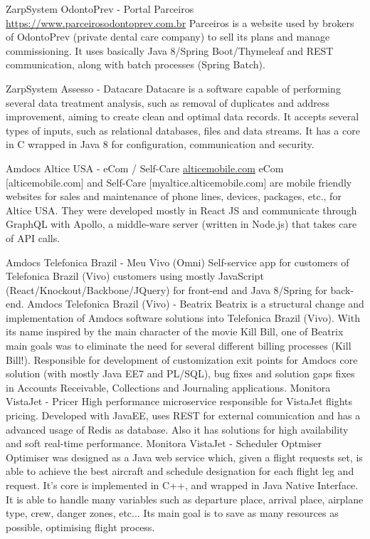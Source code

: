 \documentclass[]{friggeri-cv}
\begin{document}
\begin{entrylist}
 \entry
    {ZarpSystem}
    {OdontoPrev - Portal Parceiros}
    {\href{}{https://www.parceirosodontoprev.com.br}}
    {Parceiros is a website used by brokers of OdontoPrev (private dental care company) to sell its plans and manage commissioning. It uses basically Java 8/Spring Boot/Thymeleaf and REST communication, along with batch processes (Spring Batch). } 

 \entry
    {ZarpSystem}
    {Assesso - Datacare}
    {\href{}{}}
    {Datacare is a software capable of performing several data treatment analysis, such as removal of duplicates and address improvement, aiming to create clean and optimal data records. It accepts several types of inputs, such as relational databases, files and data streams. It has a core in C wrapped in Java 8 for configuration, communication and security.  } 
    
\entry
    {Amdocs}
    {Altice USA - eCom / Self-Care}
    {\href{eCom}{alticemobile.com}}
    {eCom [alticemobile.com] and Self-Care [myaltice.alticemobile.com] are mobile friendly websites for sales and maintenance of phone lines, devices, packages, etc., for Altice USA. They were developed mostly in React JS and communicate through GraphQL with Apollo, a middle-ware server (written in Node.js) that takes care of API calls.}

 \entry
    {Amdocs}
    {Telefonica Brazil - Meu Vivo (Omni)}
    {\href{}{}}
    {Self-service app for customers of Telefonica Brazil (Vivo) customers using mostly JavaScript (React/Knockout/Backbone/JQuery) for front-end and Java 8/Spring for back-end.} 
 \entry
    {Amdocs}
    {Telefonica Brazil (Vivo) - Beatrix}
    {\href{}{}}
    {Beatrix is a structural change and implementation of Amdocs software solutions into Telefonica Brazil (Vivo). With its name inspired by the main character of the movie Kill Bill, one of Beatrix main goals was to eliminate the need for several different billing processes (Kill Bill!). Responsible for development of customization exit points for Amdocs core solution (with mostly Java EE7 and PL/SQL), bug fixes and solution gaps fixes in Accounts Receivable, Collections and Journaling applications.}
 \entry
    {Monitora}
    {VistaJet - Pricer }
    {\href{}{}}
    {High performance microservice responsible for VistaJet flights pricing. Developed with JavaEE, uses REST for external comunication and has a advanced usage of Redis as database. Also it has solutions for high availability and soft real-time performance.}
 \entry
    {Monitora}
    {VistaJet - Scheduler Optmiser }
    {\href{}{}}
    {Optimiser was designed as a Java web service which, given a flight requests set, is able to achieve the best aircraft and schedule designation for each flight leg and request. It's core is implemented in C++, and wrapped in Java Native Interface. It is able to handle many variables such as departure place, arrival place, airplane type, crew, danger zones, etc... Its main goal is to save as many resources as possible, optimising flight process.}


\end{entrylist}
\end{document}
